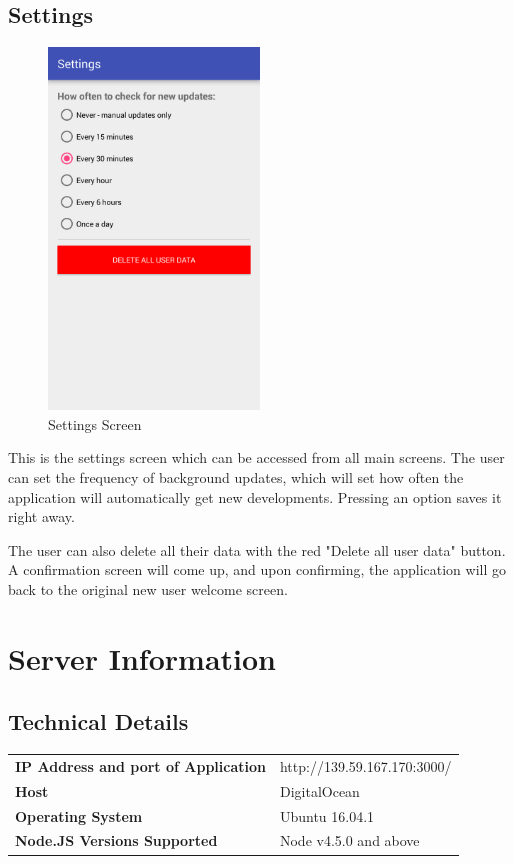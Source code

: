 \documentclass[11pt,titlepage]{report}
\begin{document}
\section{Settings}
\begin{figure}
	\vspace{-1cm}
	\begin{center}
		\includegraphics[width=0.5\textwidth]{img/settingsScreen.png}
	\end{center}
	\caption{Settings Screen}
	\vspace{-2.5cm}
\end{figure}
This is the settings screen which can be accessed from all main screens. The user can set the frequency of background updates, which will set how often the application will automatically get new developments. Pressing an option saves it right away. 

The user can also delete all their data with the red "Delete all user data" button. A confirmation screen will come up, and upon confirming, the application will go back to the original new user welcome screen. 

\chapter{Server Information}\label{appendix:serverInfo}
\section{Technical Details}
\renewcommand{\arraystretch}{1.5}
\begin{tabular}{>{\bfseries}l l}
IP Address and port of Application & http://139.59.167.170:3000/ \\
Host & DigitalOcean \\
Operating System & Ubuntu 16.04.1 \\
Node.JS Versions Supported & Node v4.5.0 and above
\end{tabular}
\end{document}
